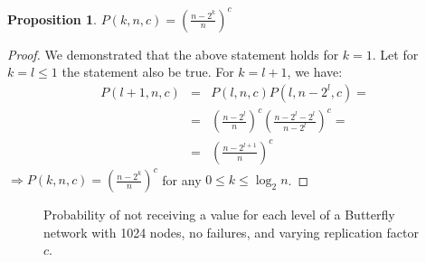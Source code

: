 \documentclass[10pt]{style}
\theoremstyle{plain}
\newtheorem{prop}[thm]{Proposition}
\theoremstyle{definition}
\theoremstyle{remark}
\numberwithin{equation}{section}
\begin{document}
  \begin{prop}
    $P(k,n,c) = (\frac{n-2^k}{n})^c$
  \end{prop}

  \begin{proof}
    We demonstrated that the above statement holds for $k=1$. Let
    for $k=l \leq 1$ the statement also be true. For $k=l+1$, we have:
    \begin{eqnarray*}
      P(l+1,n,c) &=& P(l,n,c)P(l, n-2^{l},c) = \\
      &=& (\frac{n-2^l}{n})^c(\frac{n-2^{l}-2^{l}}{n-2^l})^c =\\
      &=& (\frac{n-2^{l+1}}{n})^c
    \end{eqnarray*}
    $\Rightarrow P(k,n,c) = (\frac{n-2^k}{n})^c$ for any $0 \leq k
    \leq \log_2n$. 
  \end{proof}

  \begin{figure}
    \begin{center}
      \caption{\footnotesize Probability of not receiving a value for
      each level of a Butterfly network with 1024 nodes, no failures, and varying
      replication factor $c$.}
      \label{test}
    \end{center}
  \end{figure}
\end{document}

